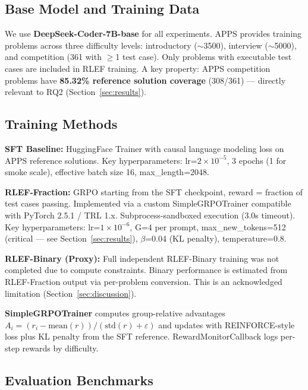 \subsection{Base Model and Training Data}

We use \textbf{DeepSeek-Coder-7B-base} for all experiments. APPS provides training problems across three difficulty levels: introductory ($\sim$3500), interview ($\sim$5000), and competition (361 with $\geq$1 test case). Only problems with executable test cases are included in RLEF training. A key property: APPS competition problems have \textbf{85.32\% reference solution coverage} (308/361) --- directly relevant to RQ2 (Section~\ref{sec:results}).

\subsection{Training Methods}

\textbf{SFT Baseline:} HuggingFace Trainer with causal language modeling loss on APPS reference solutions. Key hyperparameters: lr=$2\times10^{-5}$, 3 epochs (1 for smoke scale), effective batch size 16, max\_length=2048.

\textbf{RLEF-Fraction:} GRPO starting from the SFT checkpoint, reward = fraction of test cases passing. Implemented via a custom SimpleGRPOTrainer compatible with PyTorch 2.5.1 / TRL 1.x. Subprocess-sandboxed execution (3.0s timeout). Key hyperparameters: lr=$1\times10^{-6}$, G=4 per prompt, max\_new\_tokens=512 (critical --- see Section~\ref{sec:results}), $\beta$=0.04 (KL penalty), temperature=0.8.

\textbf{RLEF-Binary (Proxy):} Full independent RLEF-Binary training was not completed due to compute constraints. Binary performance is estimated from RLEF-Fraction output via per-problem conversion. This is an acknowledged limitation (Section~\ref{sec:discussion}).

\textbf{SimpleGRPOTrainer} computes group-relative advantages $A_i = (r_i - \text{mean}(r)) / (\text{std}(r) + \varepsilon)$ and updates with REINFORCE-style loss plus KL penalty from the SFT reference. RewardMonitorCallback logs per-step rewards by difficulty.

\subsection{Evaluation Benchmarks}

